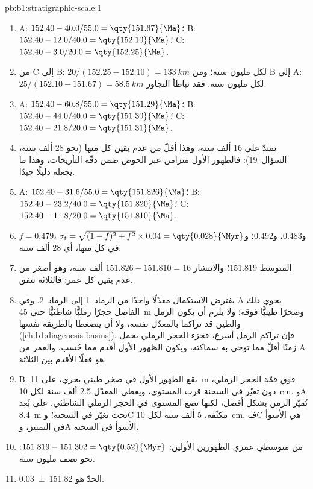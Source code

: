 \begin{solution}{pb:b1:stratigraphic-scale:1}
\begin{enumerate}
  \item A: $152.40 - 40.0/55.0 = \qty{151.67}{\Ma}$؛ B: $152.40 - 12.0/40.0 =
        \qty{152.10}{\Ma}$؛ C: $152.40 - 3.0/20.0 = \qty{152.25}{\Ma}$.
  \item من C إلى B: $20/(152.25 - 152.10) = \qty{133}{km}$ لكل مليون سنة؛ ومن B إلى A: $25/(152.10 - 151.67) = \qty{58.5}{km}$ لكل مليون سنة. فقد تباطأ التجاوز.
  \item A: $152.40 - 60.8/55.0 = \qty{151.29}{\Ma}$؛ B: $152.40 - 44.0/40.0 =
        \qty{151.30}{\Ma}$؛ C: $152.40 - 21.8/20.0 = \qty{151.31}{\Ma}$.
  \item تمتدّ على \num{16} ألف سنة، وهذا أقلّ من عدم يقين كل منها (نحو \num{28} ألف سنة، السؤال~19): فالظهور الأول متزامن عبر الحوض ضمن دقّة التأريخات، وهذا ما يجعله دليلًا جيدًا.
  \item A: $152.40 - 31.6/55.0 = \qty{151.826}{\Ma}$؛ B: $152.40 - 23.2/40.0 =
        \qty{151.820}{\Ma}$؛ C: $152.40 - 11.8/20.0 = \qty{151.810}{\Ma}$.
  \item $f = 0.479$، و$0.483$، و$0.492$؛ و$\sigma_t = \sqrt{(1 - f)^2 + f^2} \times
        0.04 = \qty{0.028}{\Myr}$ في كل منها، أي \num{28} ألف سنة.
  \item المتوسط \qty{151.819}{\Ma}؛ والانتشار $151.826 - 151.810 = \num{16}$ ألف سنة، وهو أصغر من عدم يقين كل عمر: فالثلاثة تتفق.
  \item يفترض الاستكمال معدّلًا واحدًا من الرماد~1 إلى الرماد~2. وفي A يحوي ذلك الفاصل حجرًا رمليًّا شاطئيًّا حتى \qty{45}{m} وصخرًا طينيًّا فوقه؛ ولا يلزم أن يكون الرمل والطين قد تراكما بالمعدّل نفسه، ولا أن ينضغطا بالطريقة نفسها (\cref{ch:b1:diagenesis-basins}). فإن تراكم الرمل أسرع، فجزء الحجر الرملي يحمل زمنًا أقلّ مما توحي به سماكته، ويكون الظهور الأول أقدم مما حُسب، والعمر من A هو فعلًا الأقدم بين الثلاثة.
  \item B: يقع الظهور الأول في صخر طيني بحري، على \qty{11}{m} فوق قمّة الحجر الرملي، دون تغيّر في السحنة قرب المستوى، ويعطي المعدّل \num{2.5} ألف سنة لكل \qty{10}{cm}. وA تُميّز الزمن بشكل أفضل، لكنها تضع المستوى في الحجر الرملي الشاطئي، على بُعد \qty{8.4}{m} تحت تغيّر في السحنة؛ وC مكثّفة، \num{5} ألف سنة لكل \qty{10}{cm}. فC هي الأسوأ في التمييز، وA الأسوأ في السحنة.
  \item من متوسطي عمري الظهورين الأولين: $151.819 - 151.302 =
        \qty{0.52}{\Myr}$: نحو نصف مليون سنة.
  \item الحدّ هو \qty[uncertainty-mode=separate]{151.82(3)}{\Ma}.
\end{enumerate}
\end{solution}
